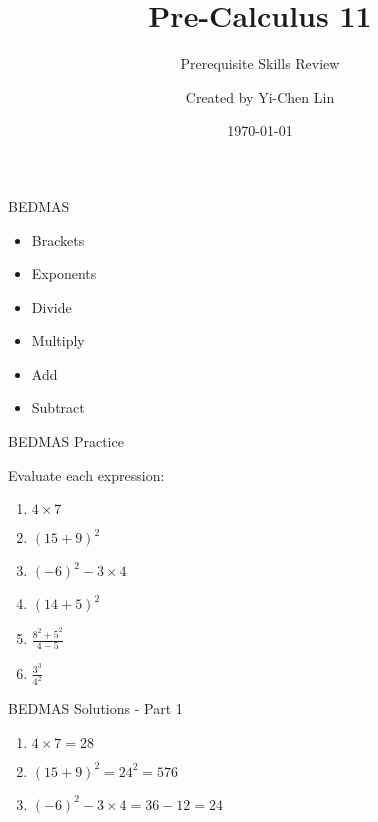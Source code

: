 \documentclass[aspectratio=169]{beamer}
\title{Pre-Calculus 11}
\subtitle{Prerequisite Skills Review}
\author{Created by Yi-Chen Lin}
\date{\today}
\begin{document}
\begin{frame}
    \titlepage
\end{frame}

\begin{frame}{BEDMAS}
    \begin{tcolorbox}[colback=lightgray,colframe=primary,title=BEDMAS Order]
        \begin{itemize}
            \item Brackets
            \item Exponents
            \item Divide
            \item Multiply
            \item Add
            \item Subtract
        \end{itemize}
    \end{tcolorbox}
\end{frame}

\begin{frame}{BEDMAS Practice}
    \begin{tcolorbox}[colback=lightgray,colframe=primary,title=Practice Problems]
        Evaluate each expression:
        \begin{enumerate}
            \item $4 \times 7$
            \item $(15 + 9)^2$
            \item $(-6)^2 - 3 \times 4$
            \item $(14 + 5)^2$
            \item $\frac{8^2 + 5^2}{4 - 5}$
            \item $\frac{3^3}{4^2}$
        \end{enumerate}
    \end{tcolorbox}
\end{frame}

\begin{frame}{BEDMAS Solutions - Part 1}
    \begin{tcolorbox}[colback=lightgray,colframe=accent,title=Solutions]
        \begin{enumerate}
            \item $4 \times 7 = 28$
            \item $(15 + 9)^2 = 24^2 = 576$
            \item $(-6)^2 - 3 \times 4 = 36 - 12 = 24$
        \end{enumerate}
    \end{tcolorbox}
\end{frame}
\end{document}
